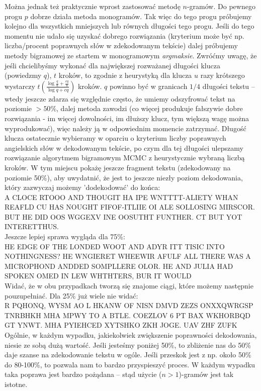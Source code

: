 \documentclass[a4paper]{article}
\theoremstyle{defn}
\theoremstyle{theorem}
\theoremstyle{lemma}
\theoremstyle{cor}
\theoremstyle{fact}
\begin{document}
Można jednak też praktycznie wprost zastosować metodę $n$-gramów. Do pewnego progu $p$ dobrze działa metoda monogramów. Tak więc do tego progu próbujemy kolejno dla wszystkich mniejszych lub równych długości tego progu. Jeśli do tego momentu nie udało się uzyskać dobrego rozwiązania (kryterium może być np. liczba/procent poprawnych słów w zdekodowanym tekście) dalej próbujemy metody bigramowej ze startem w monogramowym \textit{argmaksie}. Zwróćmy uwagę, że jeśli chcielibyśmy wykonać dla największej rozważanej długości klucza (powiedzmy $q$),  $t$ kroków, to zgodnie z heurystyką dla klucza $u$ razy krótszego wystarczy $ t(\frac{\log \frac{q}{u} + \frac{cq}{u}}{\log q + cq})$ kroków. $q$ powinno być w granicach $1/4$ długości tekstu – wtedy jeszcze zdarza się względnie często, że umiemy odszyfrować tekst na poziomie $>50\%$, dalej metoda zawodzi (co więcej produkuje fałszywie dobre rozwiązania - im więcej dowolności, im dłuższy klucz, tym większą wagę można wyprodukować), więc należy ją w odpowiednim momencie zatrzymać. Długość klucza ostatecznie wybieramy w oparciu o kryterium liczby poprawnych angielskich słów w dekodowanym tekście, po czym dla tej długości ulepszamy rozwiązanie algorytmem bigramowym MCMC z heurystycznie wybraną liczbą kroków. W tym miejscu pokażę jeszcze fragment tekstu (zdekodowany na poziomie 50\%), aby uwydatnić, że jest to jeszcze niezły poziom dekodowania, który zazwyczaj możemy 'dodekodować' do końca:\\
A CLOCE RTOOO AND THOUGIT HA IPE WNTTTT-ALIETY WHAN REAFLD CU HAS NOUGHT FIFOF-ITLIIE OI ALE SOLLOSING MIRSCOR. BUT HE DID OOS WGGEXV INE OOSUTHT FUNTHER. CT BUT YOT INTERETTHUS.
\\
Jeszcze lepiej sprawa wygląda dla 75\%:\\
HE EDGE OF THE LONDED WOOT AND ADYR ITT TISIC INTO NOTHINGNESS? HE WNGIERET WHEEWIR AFULF ALL THERE WAS A MICROPHOND ANDDED SOMPLLERE OLOR. HE AND JULIA HAD SPOKEN OMED IN LEW WHTHTERS, BUR IT WOULD
\\
Widać, że w obu przypadkach tworzą się znajome ciągi, które możemy następnie pouzupełniać. Dla 25\% już wiele nie widać:\\
R PQHONQ, WYSM AO L HKANW OF NISN DMVD ZEZS ONXXQWRGSP TNRBHKH MHA MPWY TO A BTLE. COEZLOV 6 PT BAX WKHORBQD GT YNWT. MHA PYIEHCED XYTSHKO ZKH JOGE. UAV ZHF ZUFK\\
Ogólnie, w każdym wypadku, jakiekolwiek zwiększenie poprawności dekodowania, niesie ze sobą dużą wartość. Jeśli jesteśmy poniżej 50\%, to zbliżenie nas do 50\% daje szanse na zdekodowanie tekstu w ogóle. Jeśli przeskok jest z np. około 50\% do 80-100\%, to pozwala nam to bardzo przyspieszyć proces. W każdym wypadku taka poprawa jest bardzo pożądana – stąd użycie ($n>1$)-gramów jest tak istotne.\\\\
\end{document}
